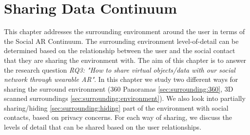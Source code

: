 \chapter{Sharing Data Continuum} %
\label{ch:data} %

This chapter addresses the surrounding environment around the user in terms of the Social AR Continuum. The surrounding environment level-of-detail can be determined based on the relationship between the user and the social contact that they are sharing the environment with.  The aim of this chapter is to answer the research question \textit{RQ3: "How to share virtual objects/data with our social network through wearable AR"}. In this chapter we study two different ways for sharing the surround environment (360 Panoramas \ref{sec:surrounding:360}, 3D scanned surroundings \ref{sec:surrounding:environment}). We also look into partially sharing/hiding \ref{sec:surrounding:hiding} part of the environment with social contacts, based on privacy concerns. For each way of sharing, we discuss the levels of detail that can be shared based on the user relationships. 





